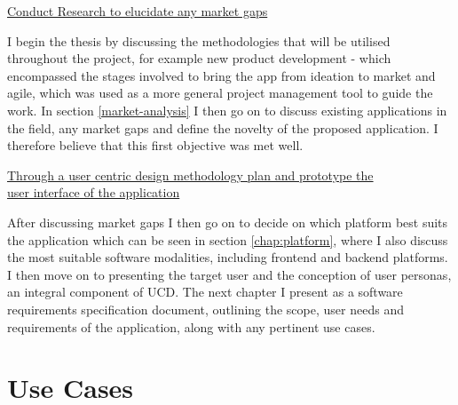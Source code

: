 \documentclass[12pt]{article}
\begin{document}
	\noindent
	\underline{Conduct Research to elucidate any market gaps}
	\newline
	
	\noindent
	I begin the thesis by discussing the methodologies that will be utilised throughout the project, for example new product development - which encompassed the stages involved to bring the app from ideation to market and agile, which was used as a more general project management tool to guide the work. In section \ref{market-analysis} I then go on to discuss existing applications in the field, any market gaps and define the novelty of the proposed application. I therefore believe that this first objective was met well.
	\newline
	
	\noindent
	\underline{Through a user centric design methodology plan and prototype the}
	\\
	\underline{user interface of the application} 
	\newline
	
	\noindent
	After discussing market gaps I then go on to decide on which platform best suits the application which can be seen in section \ref{chap:platform}, where I also discuss the most suitable software modalities, including frontend and backend platforms. I then move on to presenting the target user and the conception of user personas, an integral component of UCD. The next chapter I present as a software requirements specification document, outlining the scope, user needs and requirements of the application, along with any pertinent use cases.
	
	
	\printbibliography
	\pagebreak
	
	\appendix
	\appendixpage
	\section{Use Cases}
	\label{chap:use-cases}
		
\end{document}
